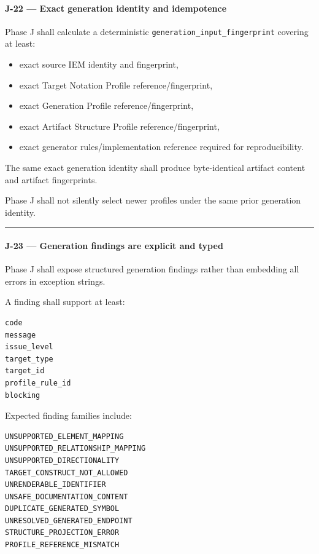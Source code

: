 \hypertarget{j-22--exact-generation-identity-and-idempotence}{%
\paragraph{J-22 --- Exact generation identity and idempotence}\label{j-22--exact-generation-identity-and-idempotence}}

Phase J shall calculate a deterministic \texttt{generation\_input\_fingerprint} covering at least:

\begin{itemize}
\tightlist
\item
  exact source IEM identity and fingerprint,
\item
  exact Target Notation Profile reference/fingerprint,
\item
  exact Generation Profile reference/fingerprint,
\item
  exact Artifact Structure Profile reference/fingerprint,
\item
  exact generator rules/implementation reference required for reproducibility.
\end{itemize}

The same exact generation identity shall produce byte-identical artifact content and artifact fingerprints.

Phase J shall not silently select newer profiles under the same prior generation identity.

\begin{center}\rule{0.5\linewidth}{0.5pt}\end{center}

\hypertarget{j-23--generation-findings-are-explicit-and-typed}{%
\paragraph{J-23 --- Generation findings are explicit and typed}\label{j-23--generation-findings-are-explicit-and-typed}}

Phase J shall expose structured generation findings rather than embedding all errors in exception strings.

A finding shall support at least:

\begin{verbatim}
code
message
issue_level
target_type
target_id
profile_rule_id
blocking
\end{verbatim}

Expected finding families include:

\begin{verbatim}
UNSUPPORTED_ELEMENT_MAPPING
UNSUPPORTED_RELATIONSHIP_MAPPING
UNSUPPORTED_DIRECTIONALITY
TARGET_CONSTRUCT_NOT_ALLOWED
UNRENDERABLE_IDENTIFIER
UNSAFE_DOCUMENTATION_CONTENT
DUPLICATE_GENERATED_SYMBOL
UNRESOLVED_GENERATED_ENDPOINT
STRUCTURE_PROJECTION_ERROR
PROFILE_REFERENCE_MISMATCH
\end{verbatim}

